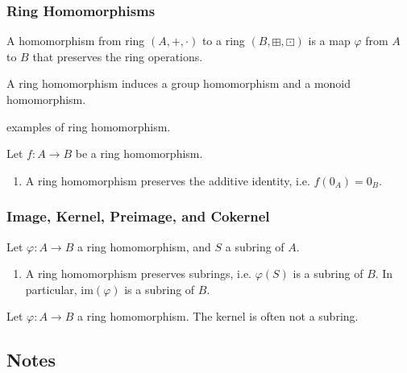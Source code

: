 \subsubsection*{Ring Homomorphisms}
\begin{defbox}
    \begin{definition}
        A homomorphism from ring \((A, +, \cdot)\) to a ring \((B, \boxplus, \boxdot)\) is a map \(\varphi\) from \(A\) to \(B\) that preserves the ring operations.
    \end{definition}
\end{defbox}
%
%
%
\begin{rembox}
    \begin{remark}
        A ring homomorphism induces a group homomorphism and a monoid homomorphism.
    \end{remark}
\end{rembox}
%
%
%
\begin{example}
    examples of ring homomorphism.
\end{example}
%
%
%
\begin{thmbox}
    \begin{proposition}
        Let \(f: A \rightarrow B\) be a ring homomorphism.
        \begin{enumerate}
            \item A ring homomorphism preserves the additive identity, i.e. \(f(0_A) = 0_B\).
        \end{enumerate}
    \end{proposition}
\end{thmbox}
\subsubsection*{Image, Kernel, Preimage, and Cokernel}

\begin{thmbox}
    \begin{proposition}
        Let \(\varphi: A \rightarrow B\) a ring homomorphism, and \(S\) a subring of \(A\).
        \begin{enumerate}
            \item A ring homomorphism preserves subrings, i.e. \(\varphi(S)\) is a subring of \(B\). In particular, \(\mathrm{im}(\varphi)\) is a subring of \(B\).
        \end{enumerate}
    \end{proposition}
\end{thmbox}

\begin{remark}
    Let \(\varphi: A \rightarrow B\) a ring homomorphism. The kernel is often not a subring.
\end{remark}

\newpage
\subsection*{Notes}


